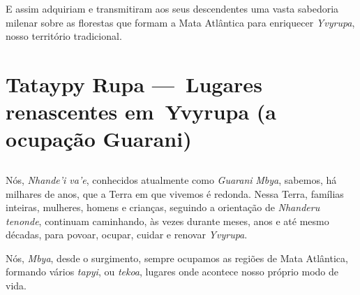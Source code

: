 E assim adquiriam e transmitiram aos seus descendentes uma vasta
sabedoria milenar sobre as florestas que formam a Mata Atlântica para
enriquecer \emph{Yvyrupa}, nosso território tradicional.





 
\ifodd\thepage\relax\else\paginabranca\fi
\part[Lugares renascentes em Yvyrupa]{Tataypy Rupa — Lugares renascentes em Yvyrupa (a ocupação Guarani)}
\chapter*{}


Nós, \emph{Nhande'i va'e}, conhecidos atualmente como \emph{Guarani}
\emph{Mbya}, sabemos, há milhares de anos, que a Terra em que vivemos é
redonda. Nessa Terra, famílias inteiras, mulheres, homens e crianças,
seguindo a orientação de \emph{Nhanderu tenonde}, continuam caminhando,
às vezes durante meses, anos e até mesmo décadas, para povoar, ocupar,
cuidar e renovar \emph{Yvyrupa}.

Nós, \emph{Mbya}, desde o surgimento, sempre ocupamos as regiões de Mata
Atlântica, formando vários \emph{tapyi}, ou \emph{tekoa}, lugares onde
acontece nosso próprio modo de vida.

 

